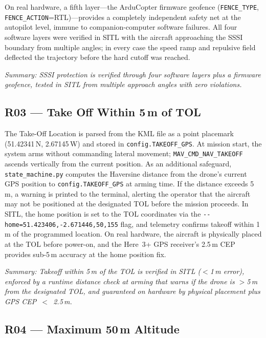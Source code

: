 \noindent On real hardware, a fifth layer---the ArduCopter firmware geofence (\texttt{FENCE\_TYPE}, \texttt{FENCE\_ACTION}=RTL)---provides a completely independent safety net at the autopilot level, immune to companion-computer software failures. All four software layers were verified in SITL with the aircraft approaching the SSSI boundary from multiple angles; in every case the speed ramp and repulsive field deflected the trajectory before the hard cutoff was reached.

\noindent\textit{Summary: SSSI protection is verified through four software layers plus a firmware geofence, tested in SITL from multiple approach angles with zero violations.}

\subsection{R03 --- Take Off Within 5\,m of TOL}

The Take-Off Location is parsed from the KML file as a point placemark (51.42341\textdegree\,N, 2.67145\textdegree\,W) and stored in \texttt{config.TAKEOFF\_GPS}. At mission start, the system arms without commanding lateral movement; \texttt{MAV\_CMD\_NAV\_TAKEOFF} ascends vertically from the current position. As an additional safeguard, \texttt{state\_machine.py} computes the Haversine distance from the drone's current GPS position to \texttt{config.TAKEOFF\_GPS} at arming time. If the distance exceeds 5\,m, a warning is printed to the terminal, alerting the operator that the aircraft may not be positioned at the designated TOL before the mission proceeds. In SITL, the home position is set to the TOL coordinates via the \texttt{-{}-home=51.423406,-2.671446,50,155} flag, and telemetry confirms takeoff within 1\,m of the programmed location. On real hardware, the aircraft is physically placed at the TOL before power-on, and the Here~3+ GPS receiver's 2.5\,m CEP provides sub-5\,m accuracy at the home position fix.

\noindent\textit{Summary: Takeoff within 5\,m of the TOL is verified in SITL ($<$1\,m error), enforced by a runtime distance check at arming that warns if the drone is $>$5\,m from the designated TOL, and guaranteed on hardware by physical placement plus GPS CEP~$<$~2.5\,m.}

\subsection{R04 --- Maximum 50\,m Altitude}

